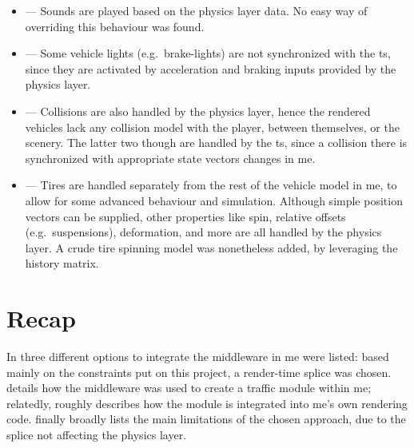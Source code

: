 \begin{itemize}
	\item {} --- Sounds are played based on the physics layer data. No easy way of overriding this behaviour was found.
	\item {} --- Some vehicle lights (e.g.\ brake-lights) are not synchronized with the \gls{ts}, since they are activated by acceleration and braking inputs provided by the physics layer.
	\item {} --- Collisions are also handled by the physics layer, hence the rendered vehicles lack any collision model with the player, between themselves, or the scenery. The latter two though are handled by the \gls{ts}, since a collision there is synchronized with appropriate state vectors changes in \gls{me}.
	\item {} --- Tires are handled separately from the rest of the vehicle model in \gls{me}, to allow for some advanced behaviour and simulation. Although simple position vectors can be supplied, other properties like spin, relative offsets (e.g.\ suspensions), deformation, and more are all handled by the physics layer. A crude tire spinning model was nonetheless added, by leveraging the history matrix.
\end{itemize}

\section{Recap}\label{sc:integration:recap}

In  three different options to integrate the \gls{middleware} in \gls{me} were listed: based mainly on the constraints put on this project, a render-time splice was chosen.  details how the \gls{middleware} was used to create a traffic module within \gls{me}; relatedly,  roughly describes how the module is integrated into \gls{me}'s own rendering code.  finally broadly lists the main limitations of the chosen approach, due to the splice not affecting the physics layer.
